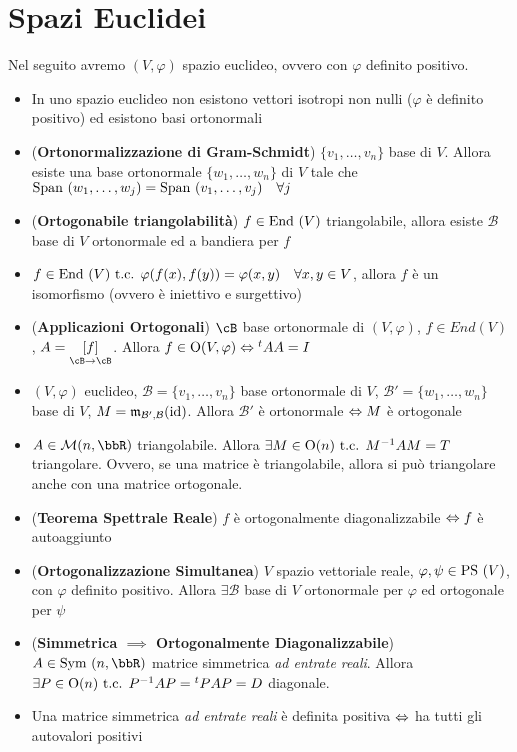 \documentclass[a4paper,NoNotes,GeneralMath]{stdmdoc}
\newcommand{\mtrapp}[3]{\underset{ {{#2} \rar {#3}} }{ \left[ {#1} \right]}}
\begin{document}
	\section*{Spazi Euclidei}
	Nel seguito avremo $(V, \varphi)$ spazio euclideo, ovvero con $\varphi$ definito positivo.
	\begin{itemize}
		\item In uno spazio euclideo non esistono vettori isotropi non nulli ($\varphi$ è definito positivo) ed esistono basi ortonormali
		\item ({\bf Ortonormalizzazione di Gram-Schmidt}) $\{v_1, \ldots, v_n\}$ base di $V$. Allora esiste una base ortonormale $\{w_1, \ldots, w_n\}$ di $V$ tale che $\mbox{Span }(w_1, \ldots, w_j) = \mbox{Span }(v_1, \ldots, v_j) \quad \forall j$
		\item ({\bf Ortogonabile triangolabilità}) $f \in \mbox{End }(V)$ triangolabile, allora esiste $\mathcal{B}$ base di $V$ ortonormale ed a bandiera per $f$
		\item $f \in \mbox{End }(V) \mbox{ t.c. } \varphi(f(x), f(y)) = \varphi(x, y) \quad \forall x, y \in V$, allora $f$ è un isomorfismo (ovvero è iniettivo e surgettivo)
		\item ({\bf Applicazioni Ortogonali}) $\cB$ base ortonormale di $(V, \varphi)$, $f \in End(V)$, $A = \mtrapp{f}{\cB}{\cB}$. Allora $f \in \mbox{O}(V, \varphi) \Leftrightarrow {}^tA A = I$
		\item $(V, \varphi)$ euclideo, $\mathcal{B} = \{v_1, \ldots, v_n\}$ base ortonormale di $V$, $\mathcal{B'} = \{w_1, \ldots, w_n\}$ base di $V$, $M = \mathfrak{m}_{\mathcal{B'}, \mathcal{B}}(\mbox{id})$. Allora $\mathcal{B'}$ è ortonormale $\Leftrightarrow M$ è ortogonale
		\item $A \in \mathcal{M}(n,\bbR)$ triangolabile. Allora $\exists M \in \mbox{O}(n) \mbox{ t.c. } M^{-1}AM = T$ triangolare. Ovvero, se una matrice è triangolabile, allora si può triangolare anche con una matrice ortogonale.
		\item ({\bf Teorema Spettrale Reale}) $f$ è ortogonalmente diagonalizzabile $\Leftrightarrow f$ è autoaggiunto
		\item ({\bf Ortogonalizzazione Simultanea}) $V$ spazio vettoriale reale, $\varphi, \psi \in \mbox{PS }(V)$, con $\varphi$ definito positivo. Allora $\exists \mathcal{B}$ base di $V$ ortonormale per $\varphi$ ed ortogonale per $\psi$
		\item ({\bf Simmetrica $\implies$ Ortogonalmente Diagonalizzabile}) $A \in \Symm(n, \bbR)$ matrice simmetrica {\it ad entrate reali}. Allora $\exists P \in \mbox{O}(n) \mbox{ t.c. } P^{-1}AP = {}^tPAP = D$ diagonale.
		\item Una matrice simmetrica {\it ad entrate reali} è definita positiva $\Leftrightarrow$ ha tutti gli autovalori positivi

\end{itemize}
\end{document}
